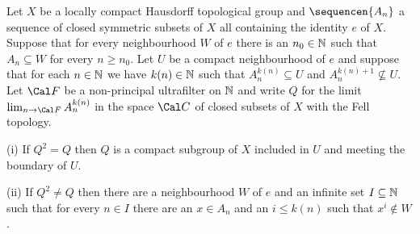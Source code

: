  Let $X$ be a locally compact Hausdorff
topological group and $\sequencen{A_n}$ a sequence of
closed symmetric subsets
of $X$ all containing the identity $e$ of $X$.   Suppose that for every
neighbourhood $W$ of $e$ there is
an $n_0\in\Bbb N$ such that $A_n\subseteq W$ for every $n\ge n_0$.   Let
$U$ be a compact neighbourhood of $e$ and suppose that for each
$n\in\Bbb N$ we have $k(n)\in\Bbb N$ such that $A_n^{k(n)}\subseteq U$
and $A_n^{k(n)+1}\not\subseteq U$.   Let $\Cal F$ be a non-principal
ultrafilter on $\Bbb N$ and write $Q$ for the limit
$\lim_{n\to\Cal F}A_n^{k(n)}$ in the space $\Cal C$
of closed subsets of $X$ with the Fell topology.

(i) If $Q^2=Q$ then $Q$ is a compact subgroup of $X$ included in $U$ and
meeting the boundary of $U$.

(ii) If $Q^2\ne Q$ then there are a neighbourhood $W$ of $e$ and an
infinite set $I\subseteq\Bbb N$ such that for every $n\in I$ there are
an $x\in A_n$ and an $i\le k(n)$ such that $x^i\notin W$.

